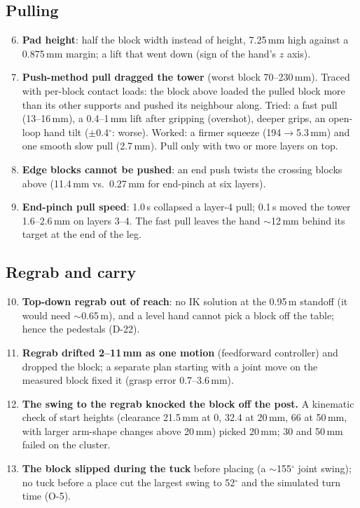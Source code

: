 \documentclass[conference]{IEEEtran}
\begin{document}
\subsection*{Pulling}
\begin{enumerate}\setcounter{enumi}{5}
\item \textbf{Pad height}: half the block width instead of height, 7.25\,mm high against a 0.875\,mm margin; a lift that
went down (sign of the hand's $z$ axis).
\item \textbf{Push-method pull dragged the tower} (worst block 70--230\,mm). Traced with per-block contact loads: the
block above loaded the pulled block more than its other supports and pushed its neighbour along. Tried: a fast pull
(13--16\,mm), a 0.4--1\,mm lift after gripping (overshot), deeper grips, an open-loop hand tilt ($\pm$0.4$^\circ$: worse).
Worked: a firmer squeeze (194$\to$5.3\,mm) and one smooth slow pull (2.7\,mm). Pull only with two or more layers on top.
\item \textbf{Edge blocks cannot be pushed}: an end push twists the crossing blocks above (11.4\,mm vs.\ 0.27\,mm for
end-pinch at six layers).
\item \textbf{End-pinch pull speed}: 1.0\,s collapsed a layer-4 pull; 0.1\,s moved the tower 1.6--2.6\,mm on layers 3--4.
The fast pull leaves the hand $\sim$12\,mm behind its target at the end of the leg.
\end{enumerate}
\subsection*{Regrab and carry}
\begin{enumerate}\setcounter{enumi}{9}
\item \textbf{Top-down regrab out of reach}: no IK solution at the 0.95\,m standoff (it would need $\sim$0.65\,m), and a
level hand cannot pick a block off the table; hence the pedestals (D-22).
\item \textbf{Regrab drifted 2--11\,mm as one motion} (feedforward controller) and dropped the block; a separate plan
starting with a joint move on the measured block fixed it (grasp error 0.7--3.6\,mm).
\item \textbf{The swing to the regrab knocked the block off the post.} A kinematic check of start heights (clearance
21.5\,mm at 0, 32.4 at 20\,mm, 66 at 50\,mm, with larger arm-shape changes above 20\,mm) picked 20\,mm; 30 and 50\,mm
failed on the cluster.
\item \textbf{The block slipped during the tuck} before placing (a $\sim$155$^\circ$ joint swing); no tuck before a place cut
the largest swing to 52$^\circ$ and the simulated turn time (O-5).
\end{enumerate}
\end{document}
